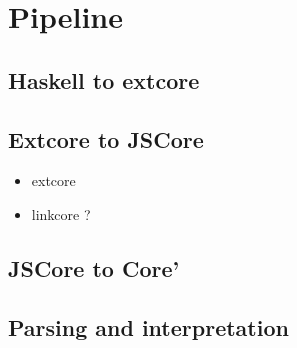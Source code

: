 

\chapter{Pipeline}
\label{chap:pipe}

\section{Haskell to extcore}

\section{Extcore to JSCore}

\begin{itemize}
\item extcore
\item linkcore ?
\end{itemize}

\section{JSCore to Core'}

\section{Parsing and interpretation}

